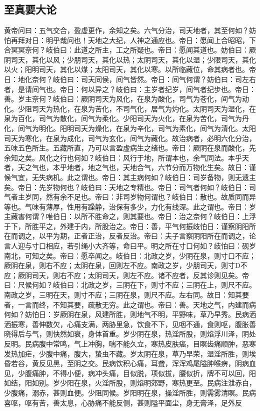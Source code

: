 \documentclass[a4paper,12pt,UTF8,twoside]{ctexbook}
\begin{document}
\part{}

\chapter{至真要大论}

黄帝问曰：五气交合，盈虚更作，余知之矣。六气分治，司天地者，其至何如？妨怕再拜对日：明乎哉问也！天地之大纪，人神之通应也。帝日：愿闻上合昭昭，下合冥冥奈何？岐伯曰：此道之所主，工之所疑也。帝日：愿闻其道也。妨伯曰：厥阴司天，其化以风；少朋司天，其化以热；太阴司天，其化以湿；少限司天，其化以火；阳明司天，其化以煤；太阳司天，其化以寒。以所临藏位，命其病者也。帝日：地化奈何？岐伯曰：司天同侯，间气皆然。帝日：间气何谓？妨伯曰：司左右者，是请间气也。帝日：何以异之？岐伯曰：主岁者纪岁，间气者纪步也。帝日：善。岁主奈何？岐伯曰：厥阴司天为风化，在泉为酸化，司气为苍化，间气为动化。少阻司天为热化，在泉为苦化，不司气化，居气为灼化。太阴司天为湿化，在泉为百化，司气为散化，间气为柔化。少阳司天为火化，在泉为苦化，司气为丹化，间气为明化。阳明司天为燥化，在泉为辛化，司气为素化，间气为清化。太阳司天为寒化，在泉为成化，司气为玄化，间气为藏化。故治病者，必明六化分治，五味五色所生。五藏所直，乃可以言盈虚病生之绪也。帝日：厥阴在泉而酸化，先余知之矣。风化之行也何如？岐伯日：风行于地，所谓本也，余气同法。本乎天者，天之气也，本乎地者，地之气也，天地合气，六节分而万物化生矣。故日：谨候气宜，无失病机。此之谓也。帝日：其主病何如？岐伯日：司岁备物，则无遗主矣。帝日：先岁物何也？岐伯曰：天地之专精也。帝日：司气者何如？岐伯日：司气者主岁同，然有余不足也。帝曰：非司岁物何谓也？岐伯日：散也。故质同而异等也。气味有薄厚，性用有躁静，治保有多少，力化有线深。此之谓也。帝日：岁主藏害何谓？唯伯日：以所不胜命之，则其要也。帝日：治之奈何？岐伯日：上浮于下，所胜平之，外建于内，所股治之。帝日：善，平气何振歧怕日：谨察阴阳所在而调之，以平为期，正者正治，反者反治。帝曰：夫子言察阴阳所在而调之，论言人迎与寸口相应，若引绳小大齐等，命曰平。明之所在寸口何如？歧怕曰：砚岁南北，可知之矣。帝曰：愿卒闻之。岐伯日：北政之岁，少阴在泉，则寸口不应；厥阴在泉，则右不应；太阴在泉，回则左不应。南政之岁，少朋司天，则寸D不应；厥阴司天，则右不应；太阴司天，则左不应。诸不应者，反其诊则见矣。帝曰：尺候何如？岐伯曰：北政之岁，三阴在下，则寸不应；三阴在上，则尺不应。南政之岁，三明在天，则寸不应；三阴在泉，则尺不应。左右同。故日：知其要者，一言而终，不知其要，疏散无穷。此之谓也。帝曰：善。天地之气，内建而病何如？妨怕日：岁厥阴在泉，风建所胜，则地气不明，平野味，草乃早秀。民病洒洒振寒，善伸数欠，心痛支满，两胁里急，饮食不下，见咽不通，食则呕，腹胀善晓得后与气，则快然如衰，身体首重。岁少阴在泉，热淫所股，则焰浮川泽，阴处反明。民病腹中常鸣，气上冲胸，喘不能久立，寒热皮肤癌，目瞑齿痛顺肿，恶寒发热加疟，少腹中痛，腹大，蛰虫不藏。岁太阴在泉，草乃早荣，湿淫所胜，则埃昏若谷，黄反见黑，至阴之交。民病饮积心痛，耳聋，浑浑鸡尾隘肿喉痹，阴病血见，少腹痛肿，不得小便，病冲头痛，目似脱，项似拔，腰似折，牌不可以回，阳如结，阳如别。岁少阳在泉，火淫所股，则焰明郊野，寒热更至。民病注泄赤白，少腹痛，溺赤，甚则血便。少阻同候。岁阳明在泉，操淫所胜，则需雾清瞑。民病喜呕，呕有苦，善太息，心胁痛不能反侧，甚则隘平面尘，身无膏泽，足外反
\end{document}
